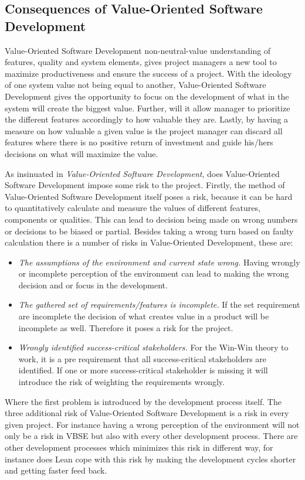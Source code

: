 \documentclass{sig-alternate}
\begin{document}
\subsection{Consequences of Value-Oriented Software Development}
\label{sec:disValueOrient}
Value-Oriented Software Development non-neutral-value understanding of features, quality and system elements, gives project managers a new tool to maximize productiveness and ensure the success of a project. With the ideology of one system value not being equal to another, Value-Oriented Software Development gives the opportunity to focus on the development of what in the system will create the biggest value. Further, will it allow manager to prioritize the different features accordingly to how valuable they are. Lastly, by having a measure on how valuable a given value is the project manager can discard all features where there is no positive return of investment and guide his/hers decisions on what will maximize the value.  

As insinuated in \textit{Value-Oriented Software Development}, does Value-Oriented Software Development impose some risk to the project. 
Firstly, the method of Value-Oriented Software Development itself poses a risk, because it can be hard to quantitatively calculate and measure the values of different features, components or qualities. This can lead to decision being made on wrong numbers or decisions to be biased or partial. Besides taking a wrong turn based on faulty calculation there is a number of risks in Value-Oriented Development, these are:  
\begin{itemize}
\item \textit{The assumptions of the environment and current state wrong.} Having wrongly or incomplete perception of the environment can lead to making the wrong decision and or focus in the development.  
\item \textit{The gathered set of requirements/features is incomplete.} If the set requirement are incomplete the decision of what creates value in a product will be incomplete as well. Therefore it poses a risk for the project.
\item \textit{Wrongly identified success-critical stakeholders.} For the Win-Win theory to work, it is a pre requirement that all success-critical stakeholders are identified. If one or more success-critical stakeholder is missing it will introduce the risk of weighting the requirements wrongly. 
\end{itemize} 

Where the first problem is introduced by the development process itself. The three additional risk of Value-Oriented Software Development is a risk in every given project. For instance having a wrong perception of the environment will not only be a risk in VBSE but also with every other development process. There are other development processes which minimizes this risk in different way, for instance does Lean cope with this risk by making the development cycles shorter and getting faster feed back. 
 
\end{document}
